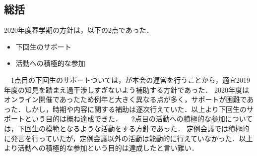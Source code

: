\subsection*{\thirdGrade{}総括}


2020年度春学期の\thirdGrade{}方針は，以下の2点であった．
\begin{itemize}
\item 下回生のサポート
\item 活動への積極的な参加
\end{itemize}
　1点目の下回生のサポートついては，\secondGrade{}が本会の運営を行うことから，適宜2019年度の知見を踏まえ過干渉しすぎないよう補助する方針であった．
2020年度はオンライン開催であったため例年と大きく異なる点が多く，サポートが困難であった．しかし，時期や内容に関する補助は逐次行えていた．以上より下回生のサポートという目的は概ね達成できた．
　2点目の活動への積極的な参加については，下回生の模範となるような活動をする方針であった．
定例会議では積極的に発言を行っていたが，定例会議以外の活動は能動的に行えていなかった．以上より活動への積極的な参加という目的は達成したと言い難い．
